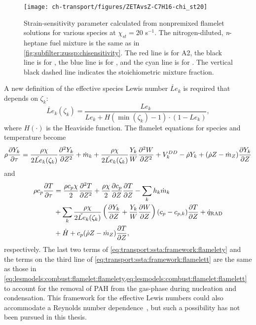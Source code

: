 \begin{figure}[htb]
  \centering
  \texttt{[image: ch-transport/figures/ZETAvsZ-C7H16-chi\_st20]}
  \caption[Strain-Sensitivity Parameter $\zeta_k$ for Various Species Within a / Mixture]{Strain-sensitivity parameter calculated from nonpremixed flamelet solutions for various species at $\chi_{st} = 20$ s$^{-1}$. The nitrogen-diluted, \textit{n}-heptane fuel mixture is the same as in \cref{fig:subfilter:zussp:chisensitivity}. The red line is for A2, the black line is for , the blue line is for , and the cyan line is for . The vertical black dashed line indicates the stoichiometric mixture fraction.}
  \label{fig:transport:ssta:framework:sspc7h16}
\end{figure}

A new definition of the effective species Lewis number $\check{Le}_k$ is required that depends on $\zeta_k$:
\begin{equation}\label{eq:transport:ssta:framework:lezetai}
  \check{Le}_k(\zeta_k) = \frac{Le_k}{Le_k + H(\min(\zeta_k) - 1)\cdot (1 - Le_k)},
\end{equation}
where $H(\cdot)$ is the Heaviside function. The flamelet equations for species and temperature become
\begin{equation}\label{eq:transport:ssta:framework:flamelety}
  \rho\pder[Y_k]{\tau} = \frac{\rho\chi}{2 \check{Le}_k(\zeta_k)}\sder[Y_k]{Z} + \dot{m}_k + \frac{\rho\chi}{2 \check{Le}_k(\zeta_k)}\frac{Y_k}{W}\sder[W]{Z} + V_k^{DD} - \dot{\rho}Y_k + (\dot{\rho}Z - \dot{m}_Z)\pder[Y_k]{Z}
\end{equation}
and
\begin{equation}\label{eq:transport:ssta:framework:flamelett}
  \begin{split}
    \rho c_p \pder[T]{\tau} &= \frac{\rho c_p \chi}{2}\sder[T]{Z} + \frac{\rho\chi}{2}\pder[c_p]{Z}\pder[T]{Z} - \sum\limits_{k} h_k\dot{m}_k \\
    &+ \sum\limits_{k} \frac{\rho\chi}{2 \check{Le}_k(\zeta_k)}\left( \pder[Y_k]{Z} + \frac{Y_k}{W}\pder[W]{Z} \right)(c_p - c_{p,k})\pder[T]{Z} + \dot{q}_{\text{RAD}} \\
    &+ \dot{H} + c_p(\dot{\rho}Z - \dot{m}_Z)\pder[T]{Z},
  \end{split}
\end{equation}
respectively. The last two terms of \cref{eq:transport:ssta:framework:flamelety} and the terms on the third line of \cref{eq:transport:ssta:framework:flamelett} are the same as those in \cref{eq:lesmodels:combust:flamelet:flamelety,eq:lesmodels:combust:flamelet:flamelett} to account for the removal of PAH from the gas-phase during nucleation and condensation. This framework for the effective Lewis numbers could also accommodate a Reynolds number dependence~\cite{wang2016}, but such a possibility has not been pursued in this thesis.


